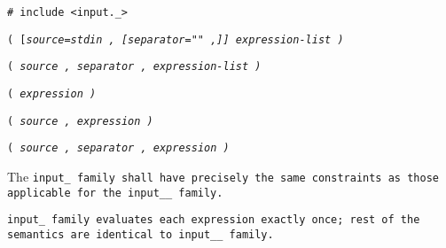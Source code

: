 
\tt{# include <input._>}

\s\s\s\tt{(} [\it{source}\tt{=stdin} \tt{,}
[\it{separator}\tt{=""} \tt{,}]] \it{expression-list} \tt{)}

\s\tt{(} \it{source} \tt{,}
 \it{separator} \tt{,} \it{expression-list} \tt{)}

\s\tt{(} \it{expression} \tt{)}

\s\tt{(} \it{source} \tt{,} \it{expression} \tt{)}

\s\tt{(} \it{source} \tt{,} \it{separator} \tt{,} \it{expression} \tt{)}


The \tt{input_} family shall have precisely the same
constraints as those applicable for the \tt{input__} family.


\tt{input_} family evaluates each expression exactly once;
rest of the semantics are identical to  \tt{input__} family.
